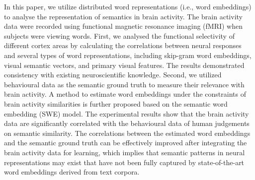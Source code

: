 In this paper, we utilize distributed word representations (i.e., word embeddings) to analyse the representation of semantics in brain activity. The brain activity data were recorded using functional magnetic resonance imaging (fMRI) when subjects were viewing words. First, we analysed the functional selectivity of different cortex areas by calculating the correlations between neural responses and several types of word representations, including skip-gram word embeddings, visual semantic vectors, and primary visual features. The results demonstrated consistency with existing neuroscientific knowledge. Second, we utilized behavioural data as the semantic ground truth to measure their relevance with brain activity. A method to estimate word embeddings under the constraints of brain activity similarities is further proposed based on the semantic word embedding (SWE) model. The experimental results show that the brain activity data are significantly correlated with the behavioural data of human judgements on semantic similarity. The correlations between the estimated word embeddings and the semantic ground truth can be effectively improved after integrating the brain activity data for learning, which implies that semantic patterns in neural representations may exist that have not been fully captured by state-of-the-art word embeddings derived from text corpora.
